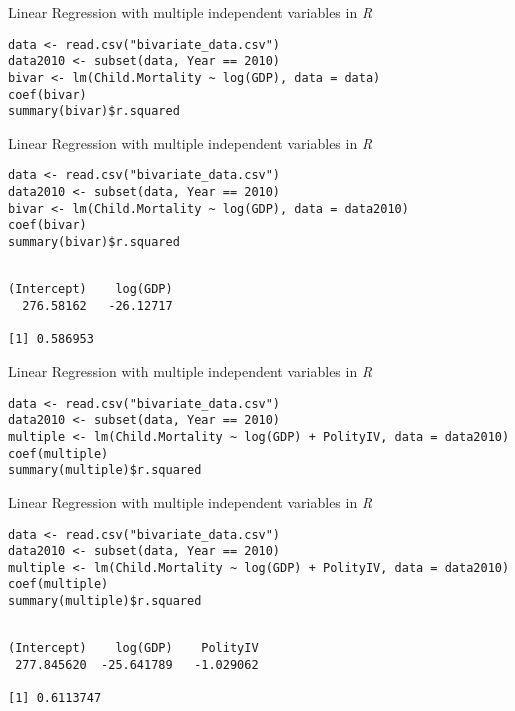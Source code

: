 \documentclass[presentation]{beamer}
\begin{document}
\begin{frame}[fragile,label={sec:org32b4628}]{Linear Regression with multiple independent variables in \emph{R}}
 \begin{verbatim}
data <- read.csv("bivariate_data.csv")
data2010 <- subset(data, Year == 2010)
bivar <- lm(Child.Mortality ~ log(GDP), data = data)
coef(bivar)
summary(bivar)$r.squared
\end{verbatim}
\end{frame}

\begin{frame}[fragile,label={sec:org1985590}]{Linear Regression with multiple independent variables in \emph{R}}
 \begin{verbatim}
data <- read.csv("bivariate_data.csv")
data2010 <- subset(data, Year == 2010)
bivar <- lm(Child.Mortality ~ log(GDP), data = data2010)
coef(bivar)
summary(bivar)$r.squared
\end{verbatim}

\begin{verbatim}

(Intercept)    log(GDP) 
  276.58162   -26.12717

[1] 0.586953
\end{verbatim}
\end{frame}




\begin{frame}[fragile,shrink=20,label={sec:org03f01ca}]{Linear Regression with multiple independent variables in \emph{R}}
 \begin{verbatim}
data <- read.csv("bivariate_data.csv")
data2010 <- subset(data, Year == 2010)
multiple <- lm(Child.Mortality ~ log(GDP) + PolityIV, data = data2010)
coef(multiple)
summary(multiple)$r.squared
\end{verbatim}
\end{frame}



\begin{frame}[fragile,shrink=20,label={sec:org008f72f}]{Linear Regression with multiple independent variables in \emph{R}}
 \begin{verbatim}
data <- read.csv("bivariate_data.csv")
data2010 <- subset(data, Year == 2010)
multiple <- lm(Child.Mortality ~ log(GDP) + PolityIV, data = data2010)
coef(multiple)
summary(multiple)$r.squared
\end{verbatim}

\begin{verbatim}

(Intercept)    log(GDP)    PolityIV 
 277.845620  -25.641789   -1.029062

[1] 0.6113747
\end{verbatim}
\end{frame}
\end{document}
